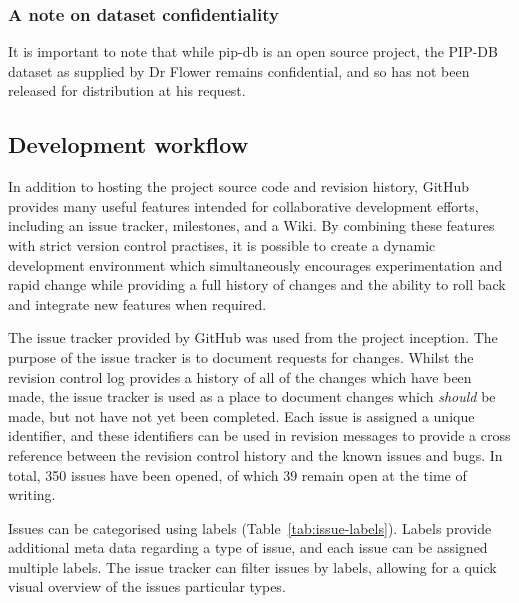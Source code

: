 \subsubsection*{A note on dataset confidentiality}
It is important to note that while pip-db is an open source project,
the PIP-DB dataset as supplied by Dr Flower remains confidential,
and so has not been released for distribution at his request.

\subsection{Development workflow}\label{subsec:github-workflow}

In addition to hosting the project source code and revision history,
GitHub provides many useful features intended for collaborative
development efforts, including an issue tracker, milestones, and a
Wiki. By combining these features with strict version control
practises, it is possible to create a dynamic development environment
which simultaneously encourages experimentation and rapid change while
providing a full history of changes and the ability to roll back and
integrate new features when required.

The issue tracker provided by GitHub was used from the project
inception. The purpose of the issue tracker is to document requests
for changes. Whilst the revision control log provides a history of all
of the changes which have been made, the issue tracker is used as a
place to document changes which \textit{should} be made, but not have
not yet been completed. Each issue is assigned a unique identifier,
and these identifiers can be used in revision messages to provide a
cross reference between the revision control history and the known
issues and bugs. In total, 350 issues have been opened, of which 39
remain open at the time of writing.

Issues can be categorised using labels
(Table~\ref{tab:issue-labels}). Labels provide additional meta data
regarding a type of issue, and each issue can be assigned multiple
labels. The issue tracker can filter issues by labels, allowing for a
quick visual overview of the issues particular types.


